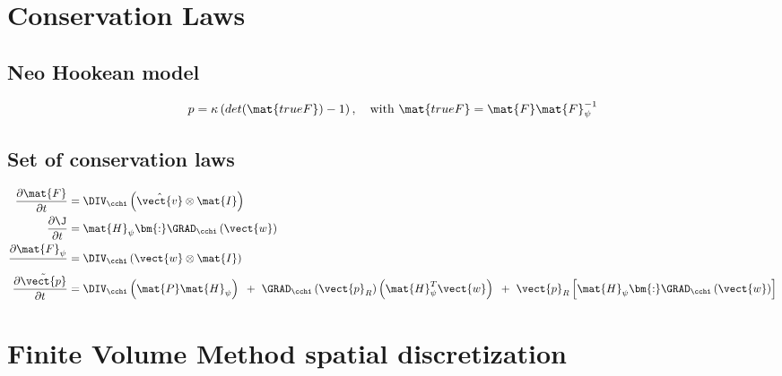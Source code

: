 \newpage
\section{Conservation Laws}
\subsection{Neo Hookean model}
\begin{equation}
	p = \kappa \left( det(\mat{trueF}) - 1 \right), \quad \textrm{with } \mat{trueF} = \mat{F} \mat{F}_{\psi}^{-1}
\end{equation}
\subsection{Set of conservation laws}
\begin{subequations}
\begin{align}
	\frac{\partial \mat{F}}{\partial t} &= \DIV_{\cchi}\left( \hat{\vect{v}} \otimes \mat{I} \right) \\ 
	\frac{\partial \J}{\partial t} &= \mat{H}_{\psi} \bm{:} \GRAD_{\cchi}\left( \vect{w} \right) \\
	\frac{\partial \mat{F}_{\psi}}{} &= \DIV_{\cchi}\left( \vect{w} \otimes \mat{I} \right) \\
	\frac{\partial \tilde{\vect{p}}}{\partial t} &= \DIV_{\cchi}\left( \mat{P}\mat{H}_{\psi}\right) {~}+{~} \GRAD_{\cchi} \left(  \vect{p}_R \right) \left( \mat{H}_{\psi}^{T}\vect{w} \right)  {~}+{~} \vect{p}_R \left[\mat{H}_{\psi} \bm{:} \GRAD_{\cchi}\left( \vect{w} \right) \right]
\end{align}
\end{subequations}


\section{Finite Volume Method spatial discretization}
%
